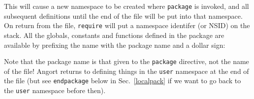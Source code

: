 This will cause a new namespace to be created where \texttt{package} is 
invoked, and all subsequent definitions until the end of the file will
be put into that namespace. On return from the file, \texttt{require} will
put a namespace identifer (or NSID) on the stack. All the globals,
constants and functions defined in the package are available by prefixing
the name with the package name and a dollar sign:
Note that the package name is that given to the \texttt{package} directive,
not the name of the file! Angort returns to defining things in the \texttt{user} namespace
at the end of the file (but see \texttt{endpackage} below in Sec.~\ref{localpack} if we want to go back to the \texttt{user}
namespace before then).

